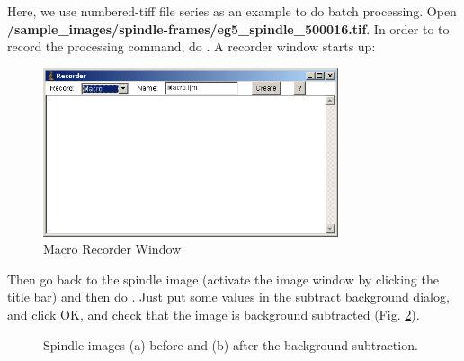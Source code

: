 \begin{indentexercise}{1}
Here, we use numbered-tiff file series as an example to do batch
processing. Open
\textbf{/sample\_images/spindle-frames/eg5\_spindle\_500016.tif}. In order to
to record the processing command, do . A recorder window starts up:

\begin{figure}[htbp]
\begin{center}
\includegraphics[width=8.678cm,height=4.942cm]{img/CMCIBasicCourse201102-img70.png}
\caption{ Macro Recorder Window}
\label{fig:img70}
\end{center}
\end{figure}


Then go back to the spindle image (activate the image window by clicking
the title bar) and then do . Just put some values in the subtract background dialog,
and click OK, and check that the image is background subtracted (Fig. \ref{fig:spindleBacksubtraction}). 


\begin{figure}[htbp]
 \centering
 \caption{ Spindle images (a) before and (b) after the
background subtraction.}
 \label{fig:spindleBacksubtraction}
\end{figure} 



\end{indentexercise}
